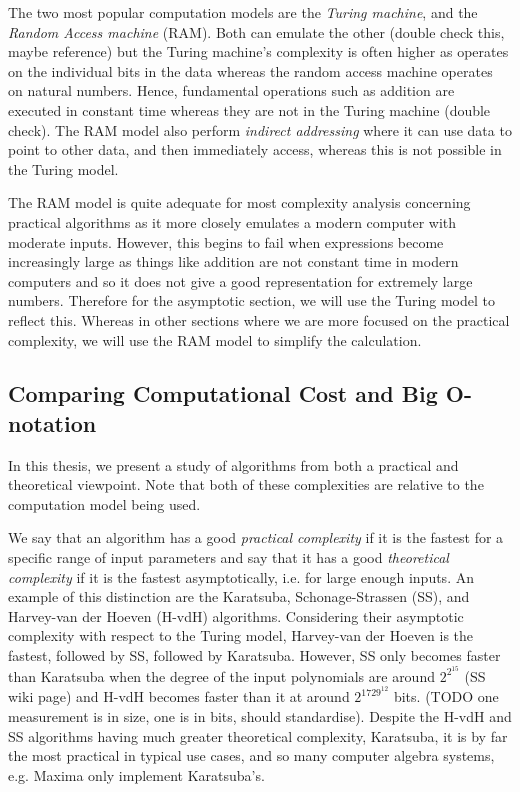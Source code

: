 The two most popular computation models are the \textit{Turing machine}, and the \textit{Random Access machine} (RAM). Both can emulate the other (double check this, maybe reference) but the Turing machine's complexity is often higher as operates on the individual bits in the data whereas the random access machine operates on natural numbers. Hence, fundamental operations such as addition are executed in constant time whereas they are not in the Turing machine (double check). The RAM model also perform \emph{indirect addressing} where it can use data to point to other data, and then immediately access, whereas this is not possible in the Turing model.

The RAM model is quite adequate for most complexity analysis concerning practical algorithms as it more closely emulates a modern computer with moderate inputs. However, this begins to fail when expressions become increasingly large as things like addition are not constant time in modern computers and so it does not give a good representation for extremely large numbers. Therefore for the asymptotic section, we will use the Turing model to reflect this. Whereas in other sections where we are more focused on the practical complexity, we will use the RAM model to simplify the calculation.

\subsection{Comparing Computational Cost and Big O-notation}%
\label{sub:Comparing Computational Cost and Big O-notation}

In this thesis, we present a study of algorithms from both a practical and theoretical viewpoint. Note that both of these complexities are relative to the computation model being used.

We say that an algorithm has a good \textit{practical complexity} if it is the fastest for a specific range of input parameters and say that it has a good \textit{theoretical complexity} if it is the fastest asymptotically, i.e. for large enough inputs. An example of this distinction are the Karatsuba, Schonage-Strassen (SS), and Harvey-van der Hoeven (H-vdH) algorithms. Considering their asymptotic complexity with respect to the Turing model, Harvey-van der Hoeven is the fastest, followed by SS, followed by Karatsuba. However, SS only becomes faster than Karatsuba when the degree of the input polynomials are around $2^{2^{15}}$ (SS wiki page) and H-vdH becomes faster than it at around $2^{1729^{12}}$ bits. (TODO one measurement is in size, one is in bits, should standardise). Despite the H-vdH and SS algorithms having much greater theoretical complexity, Karatsuba, it is by far the most practical in typical use cases, and so many computer algebra systems, e.g. Maxima only implement Karatsuba's.

